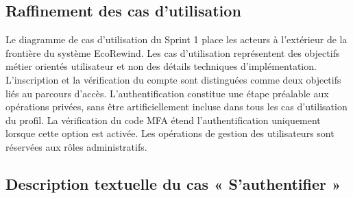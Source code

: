 \subsection{Raffinement des cas d'utilisation}

Le diagramme de cas d'utilisation du Sprint 1 place les acteurs à l'extérieur de la frontière du système EcoRewind. Les cas d'utilisation représentent des objectifs métier orientés utilisateur et non des détails techniques d'implémentation. L'inscription et la vérification du compte sont distinguées comme deux objectifs liés au parcours d'accès. L'authentification constitue une étape préalable aux opérations privées, sans être artificiellement incluse dans tous les cas d'utilisation du profil. La vérification du code MFA étend l'authentification uniquement lorsque cette option est activée. Les opérations de gestion des utilisateurs sont réservées aux rôles administratifs.

\label{fig:r1_s1_uc}

\subsection{Description textuelle du cas « S'authentifier »}

